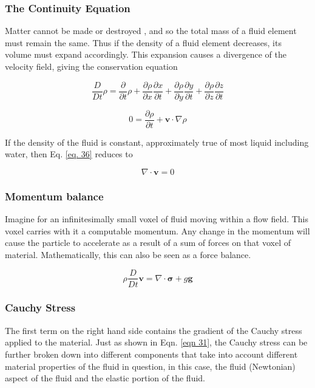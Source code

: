 \documentclass[a4paper]{article}
\begin{document}
\subsubsection{The Continuity Equation}

Matter cannot be made or destroyed , and so the total mass of a fluid element must remain the same. Thus if the density of a fluid element decreases, its volume must expand accordingly. This expansion causes a divergence of the velocity field, giving the conservation equation

\begin{equation}
    \frac{D}{Dt} \rho 
    = \frac{\partial}{\partial t} \rho + \frac{\partial \rho}{\partial x} \frac{\partial x}{\partial t} + \frac{\partial \rho}{\partial y} \frac{\partial y}{\partial t} + \frac{\partial
    \rho}{\partial z} \frac{\partial z}{\partial t} 
\end{equation}

\begin{equation}\label{eq. 36}
    \boxed{0 = \frac{\partial \rho}{\partial t} + \mathbf{v} \cdot \nabla \rho }
\end{equation}

If the density of the fluid is constant, approximately true of most liquid including water, then Eq. \ref{eq. 36} reduces to 

\begin{equation}
    \nabla \cdot \mathbf{v} = 0 
\end{equation}

\subsubsection{Momentum balance}

Imagine for an infinitesimally small voxel of fluid moving within a flow field. This voxel carries with it a computable momentum. Any change in the momentum will cause the particle to accelerate as a result of a sum of forces on that voxel of material. Mathematically, this can also be seen as a force balance. 

\begin{equation}
    \boxed{\rho \frac{D}{Dt}\mathbf{v} = \nabla \cdot \boldsymbol{\sigma} + g \mathbf{g}}
\end{equation}

\subsubsection{Cauchy Stress}
The first term on the right hand side contains the gradient of the Cauchy stress applied to the material. Just as shown in Eqn. \ref{eqn 31}, the Cauchy stress can be further broken down into different components that take into account different material properties of the fluid in question, in this case, the fluid (Newtonian) aspect of the fluid and the elastic portion of the fluid. 
\end{document}
